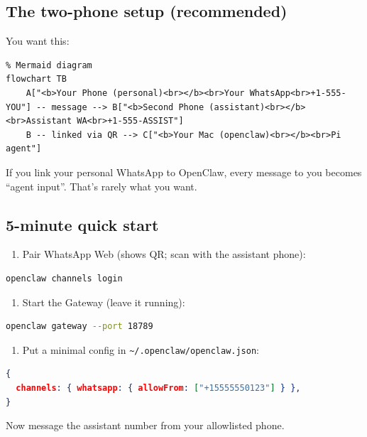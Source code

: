 \subsection{The two-phone setup (recommended)}


You want this:

\begin{verbatim}
% Mermaid diagram
flowchart TB
    A["<b>Your Phone (personal)<br></b><br>Your WhatsApp<br>+1-555-YOU"] -- message --> B["<b>Second Phone (assistant)<br></b><br>Assistant WA<br>+1-555-ASSIST"]
    B -- linked via QR --> C["<b>Your Mac (openclaw)<br></b><br>Pi agent"]
\end{verbatim}


If you link your personal WhatsApp to OpenClaw, every message to you becomes “agent input”. That’s rarely what you want.

\subsection{5-minute quick start}


\begin{enumerate}
  \item Pair WhatsApp Web (shows QR; scan with the assistant phone):
\end{enumerate}


\begin{lstlisting}[language=bash]
openclaw channels login
\end{lstlisting}


\begin{enumerate}
  \item Start the Gateway (leave it running):
\end{enumerate}


\begin{lstlisting}[language=bash]
openclaw gateway --port 18789
\end{lstlisting}


\begin{enumerate}
  \item Put a minimal config in \texttt{\textasciitilde{}/.openclaw/openclaw.json}:
\end{enumerate}


\begin{lstlisting}[language=json]
{
  channels: { whatsapp: { allowFrom: ["+15555550123"] } },
}
\end{lstlisting}


Now message the assistant number from your allowlisted phone.

